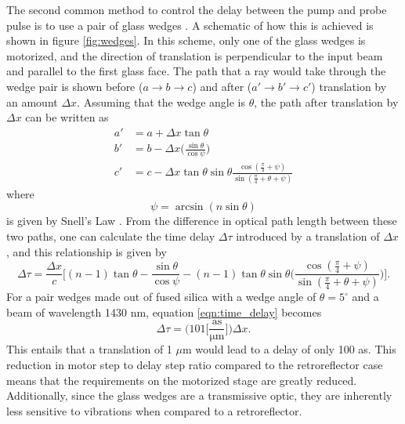 The second common method to control the delay between the pump and probe pulse is to use a pair of glass wedges \cite{chirlaAttosecondPulseGeneration2011, gormanAttosecondProbingElectron2018, kiesewetterDynamicsNearThresholdAttosecond2019}. A schematic of how this is achieved is shown in figure \ref{fig:wedges}.  In this scheme, only one of the glass wedges is motorized, and the direction of translation is perpendicular to the input beam and parallel to the first glass face.  The path that a ray would take through the wedge pair is shown before ($a\rightarrow b\rightarrow c$) and after ($a' \rightarrow b'\rightarrow c'$) translation by an amount $\Delta x$.  Assuming that the wedge angle is $\theta$, the path after translation by $\Delta x$ can be written as
\begin{align}
\label{eqn:path_lengths}
	a'&=a+\Delta x \tan\theta\\
	b'&=b-\Delta x \bigg(\frac{\sin\theta}{\cos\psi}\bigg)\\
	c'&=c-\Delta x \tan\theta\sin\theta\frac{\cos(\frac{\pi}{4}+\psi)}{\sin(\frac{\pi}{4}+\theta+\psi)}
\end{align}
where
\begin{equation}
	\psi = \arcsin(n\sin\theta)
\end{equation}
is given by Snell's Law \cite{pedrottiIntroductionOptics2007}. From the difference in optical path length between these two paths, one can calculate the time delay $\Delta\tau$ introduced by a translation of $\Delta x$, and this relationship is given by
\begin{equation}
\label{eqn:time_delay}
	\Delta\tau = \frac{\Delta x}{c}\Bigg[(n-1)\tan\theta - \frac{\sin\theta}{\cos\psi}-(n-1)\tan\theta\sin\theta\bigg(\frac{\cos(\frac{\pi}{4}+\psi)}{\sin(\frac{\pi}{4}+\theta+\psi)}\bigg)\Bigg].
\end{equation}
For a pair wedges made out of fused silica with a wedge angle of $\theta=5^\circ$ and a beam of wavelength 1430 nm, equation \ref{eqn:time_delay} becomes
\begin{equation}
\label{eqn:numerical_relationship_wedges}
	\Delta\tau = \Bigg(101 \bigg[\frac{\mathrm{as}}{\mathrm{\mu m}}\bigg]\Bigg)\Delta x.
\end{equation}
This entails that a translation of 1 $\mu$m would lead to a delay of only 100 as.  This reduction in motor step to delay step ratio compared to the retroreflector case means that the requirements on the motorized stage are greatly reduced.  Additionally, since the glass wedges are a transmissive optic, they are inherently less sensitive to vibrations when compared to a retroreflector.


